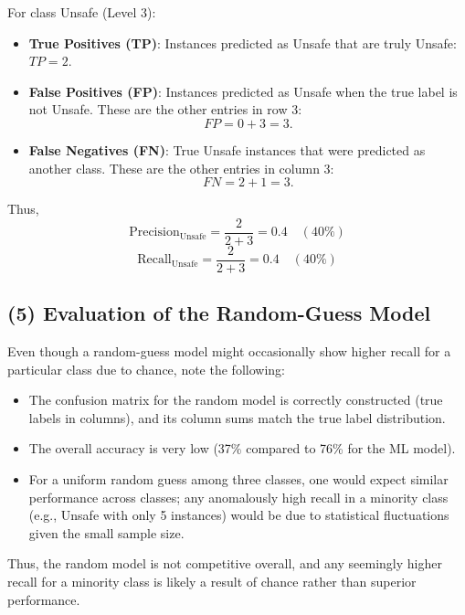 \documentclass[12pt]{article}
\begin{document}
For class Unsafe (Level 3):
\begin{itemize}
    \item \textbf{True Positives (TP)}: Instances predicted as Unsafe that are truly Unsafe: \(TP = 2\).
    \item \textbf{False Positives (FP)}: Instances predicted as Unsafe when the true label is not Unsafe. These are the other entries in row 3:
    \[
    FP = 0+3 = 3.
    \]
    \item \textbf{False Negatives (FN)}: True Unsafe instances that were predicted as another class. These are the other entries in column 3:
    \[
    FN = 2+1 = 3.
    \]
\end{itemize}
Thus,
\[
\text{Precision}_{\text{Unsafe}} = \frac{2}{2+3} = 0.4 \quad (40\%)
\]
\[
\text{Recall}_{\text{Unsafe}} = \frac{2}{2+3} = 0.4 \quad (40\%)
\]

\subsection*{(5) Evaluation of the Random-Guess Model}

Even though a random-guess model might occasionally show higher recall for a particular class due to chance, note the following:
\begin{itemize}
    \item The confusion matrix for the random model is correctly constructed (true labels in columns), and its column sums match the true label distribution.
    \item The overall accuracy is very low (37\% compared to 76\% for the ML model).
    \item For a uniform random guess among three classes, one would expect similar performance across classes; any anomalously high recall in a minority class (e.g., Unsafe with only 5 instances) would be due to statistical fluctuations given the small sample size.
\end{itemize}
Thus, the random model is not competitive overall, and any seemingly higher recall for a minority class is likely a result of chance rather than superior performance.
\end{document}
